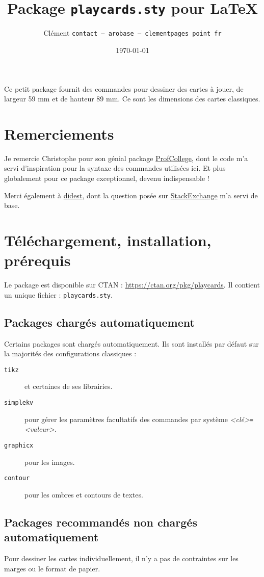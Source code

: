 \documentclass[a4paper, 12pt]{article}
\title{Package \texttt{playcards.sty} pour \LaTeX}
\date{\today}
\author{Clément \bsc{Pagès} \texttt{contact -- arobase -- clementpages point fr}}
\newcommand{\package}[1]{\texttt{#1}}
\newcommand{\kv}[2]{\textit{<#1>}\texttt=\textit{<#2>}}
\begin{document}
\maketitle

Ce petit package fournit des commandes pour dessiner des cartes à jouer, de largeur 59 mm et de hauteur 89 mm. Ce sont les dimensions des cartes classiques.

\tableofcontents

\section*{Remerciements}
Je remercie Christophe  pour son génial package \href{https://ctan.org/pkg/profcollege}{ProfCollege}, dont le code m'a servi d'inspiration pour la syntaxe des commandes utilisées ici. Et plus globalement pour ce package exceptionnel, devenu indispensable !

Merci également à \href{https://tex.stackexchange.com/users/1948/didest}{didest}, dont la question posée sur \href{https://tex.stackexchange.com/questions/47924/creating-playing-cards-using-tikz}{StackExchange} m'a servi de base.

\section{Téléchargement, installation, prérequis}
Le package est disponible sur CTAN : \href{https://ctan.org/pkg/playcards}{https://ctan.org/pkg/playcards}. Il contient un unique fichier : \texttt{playcards.sty}.

	\subsection{Packages chargés automatiquement}
Certains packages sont chargés automatiquement. Ils sont installés par défaut sur la majorités des configurations classiques :
\begin{description}
	\item[\package{tikz}] et certaines de ses librairies.
	\item[\package{simplekv}] pour gérer les paramètres facultatifs des commandes par système \kv{clé}{valeur}.
	\item[\package{graphicx}] pour les images. 
	\item[\package{contour}] pour les ombres et contours de textes.
\end{description}

	\subsection{Packages recommandés non chargés automatiquement}
Pour dessiner les cartes individuellement, il n'y a pas de contraintes sur les marges ou le format de papier.
\end{document}
